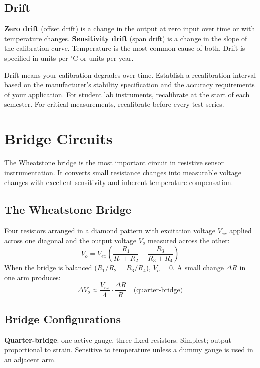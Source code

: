 \documentclass[11pt,letterpaper,twoside,openany]{book}
\newcommand{\degC}{\ensuremath{{}^{\circ}\text{C}}}
\begin{document}
\subsection{Drift}
\textbf{Zero drift} (offset drift) is a change in the output at zero input over time or with temperature changes. \textbf{Sensitivity drift} (span drift) is a change in the slope of the calibration curve. Temperature is the most common cause of both. Drift is specified in units per \degC{} or units per year.

\begin{tipbox}
Drift means your calibration degrades over time. Establish a recalibration interval based on the manufacturer's stability specification and the accuracy requirements of your application. For student lab instruments, recalibrate at the start of each semester. For critical measurements, recalibrate before every test series.
\end{tipbox}


\section{Bridge Circuits}
The Wheatstone bridge is the most important circuit in resistive sensor instrumentation. It converts small resistance changes into measurable voltage changes with excellent sensitivity and inherent temperature compensation.

\subsection{The Wheatstone Bridge}
Four resistors arranged in a diamond pattern with excitation voltage $V_{ex}$ applied across one diagonal and the output voltage $V_o$ measured across the other:
\begin{equation}
V_o = V_{ex} \left(\frac{R_1}{R_1 + R_2} - \frac{R_3}{R_3 + R_4}\right)
\end{equation}
When the bridge is balanced ($R_1/R_2 = R_3/R_4$), $V_o = 0$. A small change $\Delta R$ in one arm produces:
\begin{equation}
\Delta V_o \approx \frac{V_{ex}}{4} \cdot \frac{\Delta R}{R} \quad \text{(quarter-bridge)}
\end{equation}

\subsection{Bridge Configurations}
\textbf{Quarter-bridge}: one active gauge, three fixed resistors. Simplest; output proportional to strain. Sensitive to temperature unless a dummy gauge is used in an adjacent arm.
\end{document}
